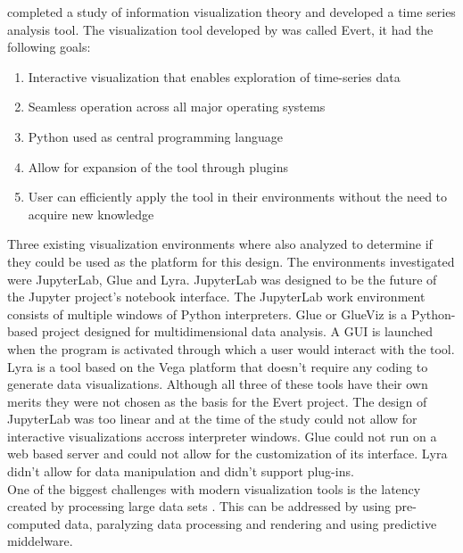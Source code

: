 \cite{Herbst2017} completed a study of information visualization theory and developed a time series analysis tool. The visualization tool developed by \cite{Herbst2017} was called Evert, it had the following goals:
\begin{enumerate}
	\item Interactive visualization that enables exploration of time-series data
	\item Seamless operation across all major operating systems
	\item Python used as central programming language
	\item Allow for expansion of the tool through plugins
	\item User can efficiently apply the tool in their environments without the need to acquire new knowledge
\end{enumerate}
Three existing visualization environments where also analyzed to determine if they could be used as the platform for this design. The environments investigated were JupyterLab, Glue and Lyra. JupyterLab was designed to be the future of the Jupyter project's notebook interface. The JupyterLab work environment consists of multiple windows of Python interpreters. Glue or GlueViz is a Python-based project designed for multidimensional data analysis. A GUI is launched when the program is activated through which a user would interact with the tool. Lyra is a tool based on the Vega platform that doesn't require any coding to generate data visualizations. Although all three of these tools have their own merits they were not chosen as the basis for the Evert project. The design of JupyterLab was too linear and at the time of the study could not allow for interactive visualizations accross interpreter windows. Glue could not run on a web based server and could not allow for the customization of its interface. Lyra didn't allow for data manipulation and didn't support plug-ins.\\

One of the biggest challenges with modern visualization tools is the latency created by processing large data sets \cite{ali2016big}. This can be addressed by using pre-computed data, paralyzing data processing and rendering and using predictive middelware.

